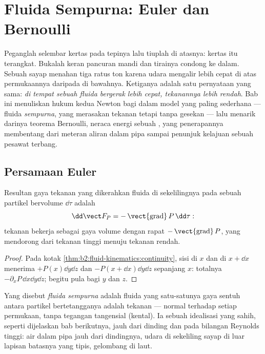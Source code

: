 \chapter{Fluida Sempurna: Euler dan Bernoulli}\label{ch:b2:euler-bernoulli}

Peganglah selembar kertas pada tepinya lalu tiuplah di atasnya: kertas
itu terangkat. Bukalah keran pancuran mandi dan tirainya condong ke
dalam. Sebuah sayap menahan tiga ratus ton karena udara mengalir lebih
cepat di atas permukaannya daripada di bawahnya. Ketiganya adalah satu
pernyataan yang sama: \emph{di tempat sebuah fluida bergerak lebih cepat,
tekanannya lebih rendah}. Bab ini menuliskan hukum kedua Newton bagi
 dalam model yang paling sederhana --- fluida
\emph{sempurna}, yang merasakan tekanan tetapi tanpa gesekan --- lalu
menarik darinya teorema Bernoulli, neraca energi sebuah ,
yang penerapannya membentang dari meteran aliran dalam pipa sampai
penunjuk kelajuan sebuah pesawat terbang.

\section{Persamaan Euler}

\begin{proposition}\label{prop:b2:euler-bernoulli:pressure}
Resultan gaya tekanan yang dikerahkan fluida di sekelilingnya pada
sebuah partikel bervolume $\dd\tau$ adalah
\[
\dd\vect F_P = -\operatorname{\vect{grad}}P\,\dd\tau :
\]
tekanan bekerja sebagai gaya volume dengan rapat $-\operatorname{\vect{grad}}P$,
yang mendorong dari tekanan tinggi menuju tekanan rendah.
\end{proposition}

\begin{proof}
Pada kotak \cref{thm:b2:fluid-kinematics:continuity}, sisi di
$x$ dan di $x + \dd x$ menerima $+P(x)\dd y\dd z$ dan $-P(x + \dd x)\dd y\dd z$
sepanjang $x$: totalnya $-\partial_xP\,\dd x\dd y\dd z$; begitu pula bagi $y$ dan $z$.
\end{proof}

\begin{definition}\label{def:b2:euler-bernoulli:perfect}
Yang disebut \emph{fluida sempurna} adalah fluida yang satu-satunya gaya
sentuh antara partikel bertetangganya adalah tekanan --- normal terhadap
setiap permukaan, tanpa tegangan tangensial (kental). Ia sebuah
idealisasi yang sahih, seperti dijelaskan bab berikutnya, jauh dari
dinding dan pada bilangan Reynolds tinggi: air dalam pipa jauh dari
dindingnya, udara di sekeliling sayap di luar lapisan batasnya yang
tipis, gelombang di laut.
\end{definition}

